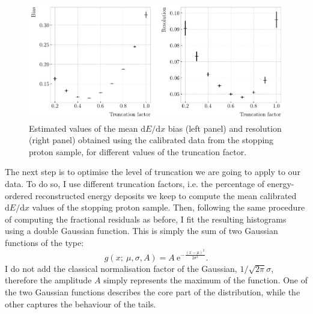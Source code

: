 \begin{figure}[t]
	\centering
	\includegraphics[width=.90\linewidth]{Images/GArSoft_PID/dEdx/reco_dEdx_truncation_opt.pdf}
	\caption[Estimated values of the mean $\mathrm{d}E/\mathrm{d}x$ bias and resolution for the stopping proton sample at different values of the truncation factor.]{Estimated values of the mean $\mathrm{d}E/\mathrm{d}x$ bias (left panel) and resolution (right panel) obtained using the calibrated data from the stopping proton sample, for different values of the truncation factor.}
	\label{fig:energy_trucation_opt}
\end{figure}

The next step is to optimise the level of truncation we are going to apply to our data. To do so, I use different truncation factors, i.e. the percentage of energy-ordered reconstructed energy deposits we keep to compute the mean calibrated $\mathrm{d}E/\mathrm{d}x$ values of the stopping proton sample. Then, following the same procedure of computing the fractional residuals as before, I fit the resulting histograms using a double Gaussian function. This is simply the sum of two Gaussian functions of the type:
\begin{equation}
	g(x;~\mu, \sigma, A) = A~\mathrm{e}^{-\frac{(x-\mu)^{2}}{2\sigma^{2}}}.
\end{equation}
I do not add the classical normalisation factor of the Gaussian, $1/\sqrt{2\pi}\sigma$, therefore the amplitude $A$ simply represents the maximum of the function. One of the two Gaussian functions describes the core part of the distribution, while the other captures the behaviour of the tails.

